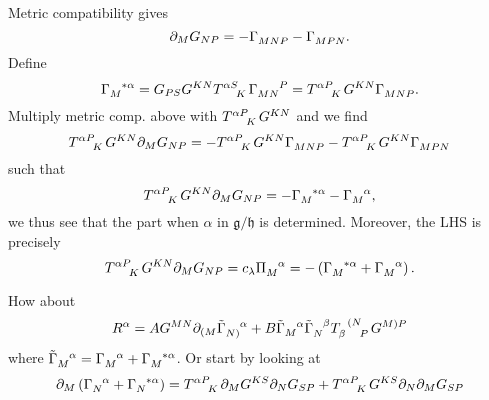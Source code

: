 \documentclass{article}
\begin{document}
Metric compatibility gives 
\begin{equation}
    \pd_MG_{NP} = -\tensor{\Gamma}{_{MNP}}-\tensor{\Gamma}{_{MPN}}.
\end{equation}
Define 
\begin{equation}
    \tensor{\Gamma}{_M^{*\alpha}} = G_{PS}G^{KN}\tensor{T}{^\alpha^S_K}\tensor{\Gamma}{_{MN}^P} = \tensor{T}{^\alpha^P_K}G^{KN}\tensor{\Gamma}{_{MNP}}.
\end{equation}
Multiply metric comp. above with $\tensor{T}{^\alpha^P_K}G^{KN}$ and we find 
\begin{equation}
    \tensor{T}{^\alpha^P_K}G^{KN}\pd_MG_{NP} = -\tensor{T}{^\alpha^P_K}G^{KN}\tensor{\Gamma}{_{MNP}}-\tensor{T}{^\alpha^P_K}G^{KN}\tensor{\Gamma}{_{MPN}}
\end{equation}
such that 
\begin{equation}
    \tensor{T}{^\alpha^P_K}G^{KN}\pd_MG_{NP} = -\tensor{\Gamma}{_M^{*\alpha}}-\tensor{\Gamma}{_M^\alpha},
\end{equation}
we thus see that the part when $\alpha$ in $\mathfrak{g}/\mathfrak{h}$ is determined. Moreover, the LHS is precisely 
\begin{equation}
    \tensor{T}{^\alpha^P_K}G^{KN}\pd_MG_{NP} = c_\lambda \tensor{\Pi}{_M^\alpha}=-\left(\tensor{\Gamma}{_M^{*\alpha}}+\tensor{\Gamma}{_M^\alpha}\right).
\end{equation}


How about 
\begin{equation}
    R^\alpha = AG^{MN}\pd_{(M}\tensor{\tilde{\Gamma}}{_{N)}^\alpha}+B\tensor{\tilde{\Gamma}}{_M^\alpha}\tensor{\tilde{\Gamma}}{_N^\beta}\tensor{T}{_{\beta}^{(N}_P}G^{M)P}
\end{equation}
where $\tensor{\tilde{\Gamma}}{_M^\alpha}=\tensor{\Gamma}{_M^\alpha}+\tensor{\Gamma}{_M^{*\alpha}}$. Or start by looking at 
\begin{equation}
    \pd_{M}\left(\tensor{\Gamma}{_{N}^\alpha}+\tensor{\Gamma}{_{N}^{*\alpha}}\right) = \tensor{T}{^\alpha ^P_K}\pd_M G^{KS}\pd_NG_{SP}+\tensor{T}{^\alpha ^P_K} G^{KS}\pd_N\pd_MG_{SP}
\end{equation}
\end{document}
